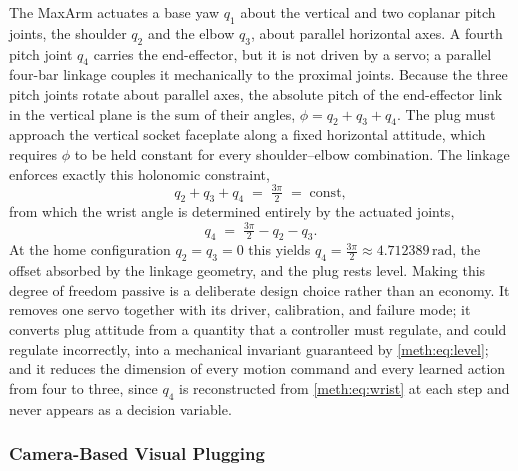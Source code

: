 The MaxArm actuates a base yaw $q_1$ about the vertical and two coplanar pitch joints, the shoulder $q_2$ and the elbow $q_3$, about parallel horizontal axes. A fourth pitch joint $q_4$ carries the end-effector, but it is not driven by a servo; a parallel four-bar linkage couples it mechanically to the proximal joints. Because the three pitch joints rotate about parallel axes, the absolute pitch of the end-effector link in the vertical plane is the sum of their angles, $\phi = q_2 + q_3 + q_4$. The plug must approach the vertical socket faceplate along a fixed horizontal attitude, which requires $\phi$ to be held constant for every shoulder--elbow combination. The linkage enforces exactly this holonomic constraint,
\begin{equation}
  q_2 + q_3 + q_4 \;=\; \tfrac{3\pi}{2} \;=\; \mathrm{const},
  \label{meth:eq:level}
\end{equation}
from which the wrist angle is determined entirely by the actuated joints,
\begin{equation}
  q_4 \;=\; \tfrac{3\pi}{2} - q_2 - q_3.
  \label{meth:eq:wrist}
\end{equation}
At the home configuration $q_2 = q_3 = 0$ this yields $q_4 = \tfrac{3\pi}{2} \approx \ensuremath{4.712389\,\mathrm{rad}}$, the offset absorbed by the linkage geometry, and the plug rests level. Making this degree of freedom passive is a deliberate design choice rather than an economy. It removes one servo together with its driver, calibration, and failure mode; it converts plug attitude from a quantity that a controller must regulate, and could regulate incorrectly, into a mechanical invariant guaranteed by \eqref{meth:eq:level}; and it reduces the dimension of every motion command and every learned action from four to three, since $q_4$ is reconstructed from \eqref{meth:eq:wrist} at each step and never appears as a decision variable.

\subsubsection{Camera-Based Visual Plugging}\label{meth:sec:manip:vision}

